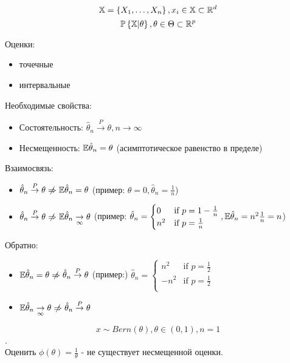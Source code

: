 $$ \mathbb{X} = \left\{ X_1, \ldots, X_n \right\}, x_i \in \mathbb{X} \subset \mathbb{R}^d $$
$$ \mathbb{P}\left\{ \mathbb{X} | \theta \right\}, \theta \in \Theta \subset \mathbb{R}^p $$

Оценки:
\begin{itemize}
	\item точечные
	\item интервальные
\end{itemize}

Необходимые свойства:
\begin{itemize}
	\item Состоятельность: $\hat{\theta}_n \overset{P}{\to} \theta, n \to \infty$
	\item Несмещенность: $\mathbb{E}\hat{\theta}_n = \theta$ (асимптотическое равенство в пределе)
\end{itemize}
Взаимосвязь:
\begin{itemize}
	\item $\hat{\theta}_n \overset{P}{\to} \theta \notif \set{E}\hat{\theta}_n = \theta$ {\Huge(}пример: $\theta=0, \hat{\theta}_n = \frac{1}{n}${\Huge)}
	\item $\hat{\theta}_n \overset{P}{\to} \theta \notif \set{E}\hat{\theta}_n \underset{\infty}{\to} \theta$ (пример: $ \hat{\theta}_n = 
	\begin{cases}
    0       & \text{if } p=1-\frac{1}{n}\\
    n^2  &\text{if } p=\frac{1}{n}\\
  \end{cases},
  \mathbb{E}\hat{\theta}_n = n^2 \frac{1}{n} = n $)
\end{itemize}

Обратно:
\begin{itemize}
	\item $ \set{E}\hat{\theta}_n = \theta \notif \hat{\theta}_n \overset{P}{\to} \theta$ (пример:) $\hat{\theta}_n = \begin{cases}
    n^2       & \text{if } p=\frac{1}{2}\\
    -n^2  &\text{if } p=\frac{1}{2}\\
  \end{cases}$
	\item $\set{E}\hat{\theta}_n \underset{\infty}{\to} \theta \notif \hat{\theta}_n \overset{P}{\to} \theta $
\end{itemize}
\begin{example}
$$ x \sim Bern(\theta), \theta \in (0,1), n=1$$. \\ Оценить $\phi(\theta) = \frac{1}{\theta}$ - не существует несмещенной оценки. \\
\\

\end{example}

